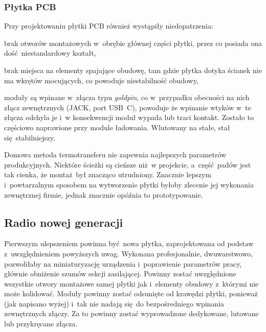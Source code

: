 \documentclass[polish]{aghengthesis}
\let\tempone\itemize
\let\temptwo\enditemize
\renewenvironment{itemize}{\tempone\setlength{\itemsep}{0cm}}{\temptwo}
\begin{document}
			\subsubsection{Płytka PCB}
				Przy projektowaniu płytki PCB również wystąpiły niedopatrzenia:
				\begin{itemize}
					\item brak otworów montażowych w~obrębie głównej części płytki, przez co posiada ona dość niestandardowy kształt,
					\item brak miejsca na elementy spajające obudowę, tam gdzie płytka dotyka ścianek nie ma wkrętów mocujących, co powoduje niestabilność obudowy,
					\item moduły są wpinane w~złącza typu \textit{goldpin}, co w~przypadku obecności na nich złącz zewnętrznych (JACK, port USB~C), powoduje że wpinanie wtyków w~te złącza odchyla je i~w konsekwencji moduł wypada lub traci kontakt. Zostało to częściowo naprawione przy module ładowania. Wlutowany na stałe, stał się stabilniejszy.
				\end{itemize}
				
				Domowa metoda termotransferu nie zapewnia najlepszych parametrów produkcyjnych. Niektóre ścieżki są cieńsze niż w projekcie, a~część padów jest tak cienka, że montaż był znacząco utrudniony. Znacznie lepszym i~powtarzalnym sposobem na wytworzenie płytki byłoby zlecenie jej wykonania zewnętrznej firmie, jednak znacznie opóźnia to prototypowanie.
		
		\subsection{Radio nowej generacji}
			Pierwszym ulepszeniem powinna być nowa płytka, zaprojektowana od podstaw z~uwzględnieniem powyższych uwag. Wykonana profesjonalnie, dwuwarstwowo, pozwoliłaby na miniaturyzację urządzenia i~poprawienie parametrów pracy, głównie obniżenie szumów sekcji zasilającej. Powinny zostać uwzględnione wszystkie otwory montażowe samej płytki jak i~elementy obudowy z~którymi nie może kolidować. Moduły powinny zostać odsunięte od krawędzi płytki, ponieważ (jak napisano wyżej) i~tak nie nadają się do bezpośredniego wpinania zewnętrznych złączy. Za to powinny zostać wyprowadzone dedykowane, lutowane lub przykręcane złącza.
			$ $\\
\end{document}
